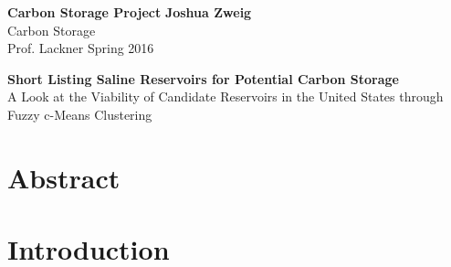 \documentclass[letterpaper, 12pt]{article}
\begin{document}
\noindent
\large\textbf{Carbon Storage Project} \hfill \textbf{Joshua Zweig} \\
\normalsize Carbon Storage \\
Prof. Lackner \hfill Spring 2016 \\

\begin{centering}
\textbf{Short Listing Saline Reservoirs for Potential Carbon Storage} \\
A Look at the Viability of Candidate Reservoirs in the United States through\\
Fuzzy c-Means Clustering\\
\end{centering}

\section*{Abstract}


\section{Introduction}
\end{document}
